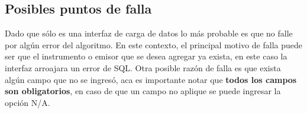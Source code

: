 \documentclass{article}
\begin{document}
\subsection{Posibles puntos de falla}

Dado que sólo es una interfaz de carga de datos lo más probable es que no falle por algún error del algoritmo. En este contexto, el principal motivo de falla puede ser que el instrumento o emisor que se desea agregar ya exista, en este caso la interfaz arroajara un error de SQL. Otra posible razón de falla es que exista algún campo que no se ingresó, aca es importante notar que \textbf{todos los campos son obligatorios}, en caso de que un campo no aplique se puede ingresar la opción N/A.
\end{document}
